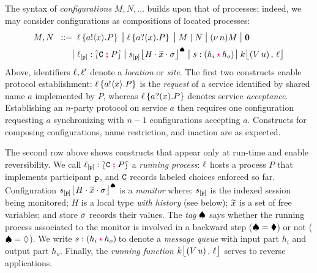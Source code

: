 \documentclass[runningheads,plain]{llncs}
\begin{document}
The syntax of \emph{configurations} $M, N, \ldots$ builds upon that of processes; indeed, we may consider configurations as compositions of located processes:
\begin{align*}
M,N		 \bnfis &
\myloc{\loc}{\bout{a}{x}{P}}
\sbnfbar 
\myloc{\loc}{\binp{a}{x}{P}}
\sbnfbar 
M \Par N 
\sbnfbar 
\news{n} M
\sbnfbar 
\inact 
\\
 \sbnfbar &
{\np{\ep{\loc}{\p}}{\conf{\stack C}{P}}} %
\sbnfbar 
{\monig{\ep{s}{\p}}{H}{\mytilde{x}}{\store}}  %
 \sbnfbar 
\codah{s}{h_i}{h_o}%
\sbnfbar 
 {\mem{k}{(\appl{V}{u})}{\loc}} %
\end{align*}
Above,  identifiers $\ell, \ell'$ denote a  \emph{location} or  \emph{site}. 
The first two constructs enable protocol establishment:
$\ell\left\{a ! \langle x \rangle .{P}\right\}$ is the \emph{request} of a service identified by shared name $a$ implemented by
$P$, whereas $\ell\left\{a ? (x) .{P}\right\}$ denotes service \emph{acceptance}. 
Establishing an $n$-party protocol on service $a$ then requires one configuration requesting $a$ 
synchronizing with  $n-1$ configurations accepting $a$.
Constructs for  composing configurations, name restriction, and  inaction are as expected.

The second row above shows constructs that appear only at run-time 
and   enable  reversibility. 
We call $\ell_{[\mathtt{p}]}:\lbag \mathtt{C} \; \textcolor{magenta}{\textbf{;}}\; P \rbag$ a \emph{running process}:  $\ell$ hosts a process $P$ that implements participant $\mathtt{p}$, and $\mathtt{C}$ records labeled choices enforced so far. Configuration ${s_{[\mathtt{p}]}\mbox{{\large $\lfloor$}} \textcolor{black}{H}\cdot \widetilde{x}\cdot \sigma \mbox{{\large $\rfloor$}}^{\spadesuit}}$ is a \emph{monitor}
where: 
$s_{[\mathtt{p}]}$ is the indexed session being monitored;
$H$ is a  local type \emph{with history} (see below);
$\widetilde{x}$ is a set of free variables;
and store $\sigma$ records their values.
The \emph{tag} $\spadesuit$ says whether 
the running process associated to the monitor is involved in a backward step ($\spadesuit = \blacklozenge$) or not ($\spadesuit = \lozenge$).
We write $\codah{s}{h_i}{h_o}$ to denote a \emph{message queue} with input part $h_i$ and output part $h_o$.
Finally, the \emph{running function} $k\mbox{{\large $\lfloor$}} (V\, {u})\,,\, \ell \mbox{{\large $\rfloor$}}$ serves to  reverse  applications.
\end{document}
